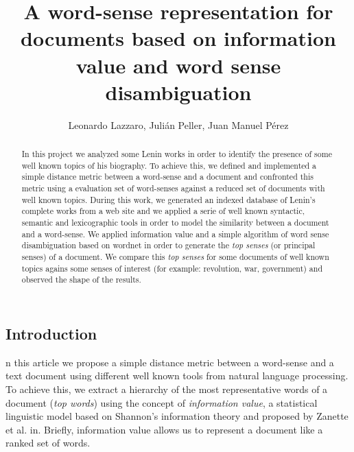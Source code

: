 \documentclass{pnastwo}
\begin{document}
\title{A word-sense representation for documents based on information value and word sense disambiguation}

\author{Leonardo Lazzaro,
Julián Peller,
Juan Manuel Pérez
}


\maketitle

\begin{article}
\begin{abstract}
In this project we analyzed some Lenin works in order to identify the presence of some well known topics of his biography. To achieve this, we defined and implemented a simple distance metric between a word-sense and a document and confronted this metric using a evaluation set of word-senses against a reduced set of  documents with well known topics. During this work, we generated an indexed database of Lenin's complete works from a web site\cite{LENIN} and we applied a serie of well known syntactic, semantic and lexicographic tools in order to model the similarity between a document and a word-sense. We applied information value\cite{DARWIN} and a simple algorithm of word sense disambiguation\cite{LESK} based on wordnet\cite{WORDNET} in order to generate the \textit{top senses} (or principal senses) of a document. We compare this \textit{top senses} for some documents of well known topics agains some senses of interest (for example: revolution, war, government) and observed the shape of the results. 
\end{abstract}



\section{Introduction}

n this article we propose a simple distance metric between a word-sense and a text document using different well known tools from natural language processing. To achieve this, we extract a hierarchy of the most representative words of a document (\textit{top words}) using the concept of \textit{information value}, a statistical linguistic model based on Shannon's information theory and proposed by Zanette et al. in\cite{DARWIN}. Briefly, information value allows us to represent a document like a ranked set of words. 


\end{article}
\end{document}
